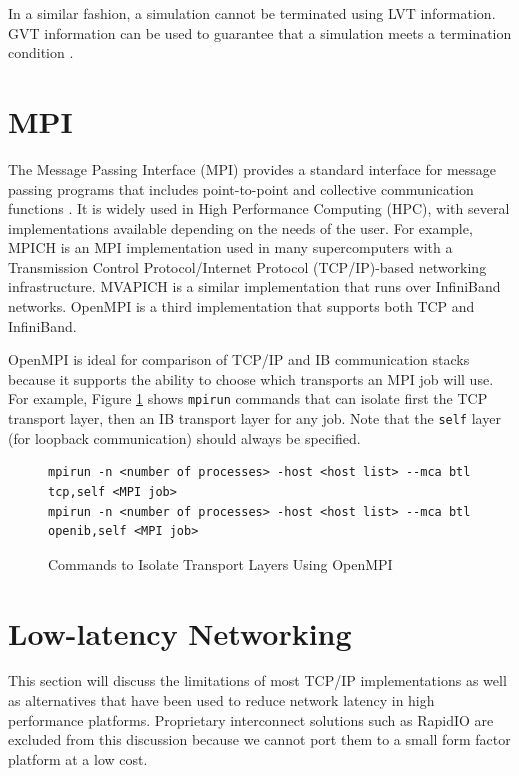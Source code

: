 \documentclass[11pt]{book}
\begin{document}
In a similar fashion, a simulation cannot be terminated using LVT information.  GVT
information can be used to guarantee that a simulation meets a termination condition
\cite{jefferson-85}.

\section{MPI}

The Message Passing Interface (MPI) provides a standard interface for message passing
programs that includes point-to-point and collective communication functions
\cite{mpi-12}.  It is widely used in High Performance Computing (HPC), with several
implementations available depending on the needs of the user.  For example, MPICH
\cite{mpich} is an MPI implementation used in many supercomputers with a Transmission
Control Protocol/Internet Protocol (TCP/IP)-based networking infrastructure.  MVAPICH
\cite{mvapich} is a similar implementation that runs over InfiniBand networks.  OpenMPI
\cite{openmpi} is a third implementation that supports both TCP and InfiniBand.

OpenMPI is ideal for comparison of TCP/IP and IB communication stacks because it supports
the ability to choose which transports an MPI job will use.  For example, Figure
\ref{ompi-btl} shows \verb;mpirun; commands that can isolate first the TCP transport
layer, then an IB transport layer for any job.  Note that the \verb;self; layer (for
loopback communication) should always be specified.

\begin{figure}
\centering
\begin{verbatim}
mpirun -n <number of processes> -host <host list> --mca btl tcp,self <MPI job>
mpirun -n <number of processes> -host <host list> --mca btl openib,self <MPI job>
\end{verbatim}
\caption{Commands to Isolate Transport Layers Using OpenMPI}\label{ompi-btl}
\end{figure}

\section{Low-latency Networking}

This section will discuss the limitations of most TCP/IP implementations as well as
alternatives that have been used to reduce network latency in high performance platforms.
Proprietary interconnect solutions such as RapidIO \cite{fuller-05} are excluded from this
discussion because we cannot port them to a small form factor platform at a low cost.
\end{document}
